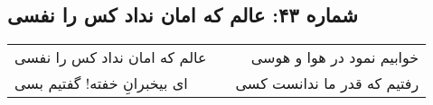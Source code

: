 \begin{center}
\section*{شماره ۴۳: عالم که امان نداد کس را نفسی}
\label{sec:043}
\begin{longtable}{l p{0.5cm} r}
عالم که امان نداد کس را نفسی
&&
خوابیم نمود در هوا و هوسی
\\
ای بیخبرانِ خفته! گفتیم بسی
&&
رفتیم که قدر ما ندانست کسی
\\
\end{longtable}
\end{center}
